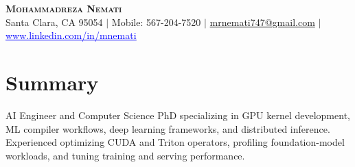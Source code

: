 \documentclass[letterpaper,13pt]{article}
\begin{document}
\begin{center}
    \textbf{\LARGE \scshape Mohammadreza Nemati} \\ \vspace{1pt}
    \small Santa Clara, CA 95054 $|$ Mobile: 567-204-7520 $|$
    \href{mailto:mrnemati747@gmail.com}{mrnemati747@gmail.com} $|$
    \href{https://www.linkedin.com/in/mnemati/}{\textcolor{blue}{\underline{www.linkedin.com/in/mnemati}}}
\end{center}

\section{Summary}
\small{AI Engineer and Computer Science PhD specializing in GPU kernel development, ML compiler workflows, deep learning frameworks, and distributed inference. Experienced optimizing CUDA and Triton operators, profiling foundation-model workloads, and tuning training and serving performance.}
\vspace{0.05cm}
\end{document}
